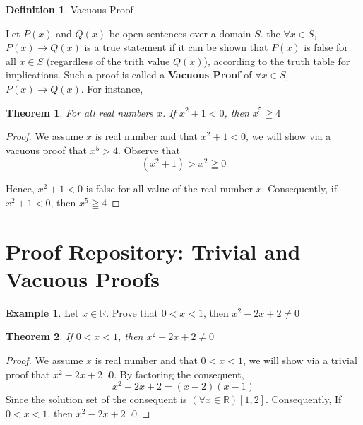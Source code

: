 \documentclass{book}
\newtheorem{theorem}{Theorem}[section]
\theoremstyle{definition}
\newtheorem{definition}{Definition}[section]
\newtheorem{example}{Example}[definition]
\theoremstyle{remark}
\newcommand{\bb}[1]{\mathbb{#1}}
\begin{document}
\begin{definition}
Vacuous Proof

Let $P(x)$ and $Q(x)$ be open sentences over a domain $S$. the $\forall x \in S$, $P(x) \to Q(x)$ is a true statement if it can be shown that $P(x)$ is false for all $x \in S$ (regardless of the trith value $Q(x)$), according to the truth table for implications. Such a proof is called a {\bf Vacuous Proof} of $\forall x \in S$, $P(x) \to Q(x)$. For instance, 

\begin{tcolorbox}
	\begin{theorem}
		For all real numbers $x$. If $x^2 + 1 < 0$, then $x^5 \geqq 4$
	\end{theorem}
\end{tcolorbox}

\begin{proof}
We assume $x$ is real number and that $x^2 + 1 < 0$, we will show via a vacuous proof that $x^5 > 4$. Observe that 
	\begin{equation}
		(x^2 + 1) > x^2 \geqq 0 \nonumber 
	\end{equation}

Hence, $x^2 + 1 < 0$ is false for all value of the real number $x$. Consequently, if $x^2 + 1 < 0$, then $x^5 \geqq 4$
\end{proof}

\end{definition}



\newpage
\section{Proof Repository: Trivial and Vacuous Proofs}

\begin{example}
Let $x \in \bb{R}$. Prove that $0<x<1$, then $x^2-2x + 2 \neq 0$

\begin{tcolorbox}
	\begin{theorem}
		If $0<x<1$, then $x^2-2x + 2 \neq 0$
	\end{theorem}
\end{tcolorbox}

\begin{proof}
We assume $x$ is real number and that $0<x<1$, we will show via a trivial proof that $x^2 -2x + 2 \neg 0$. By factoring the consequent, 
	\begin{equation}
		x^2 - 2x + 2 = (x-2)(x-1)  \nonumber 
	\end{equation}
Since the solution set of the consequent is $(\forall x \in \bb{R})[ 1, 2]$. Consequently, If $0<x<1$, then $x^2-2x + 2 \neg 0$

\end{proof}
\end{example}
\end{document}
